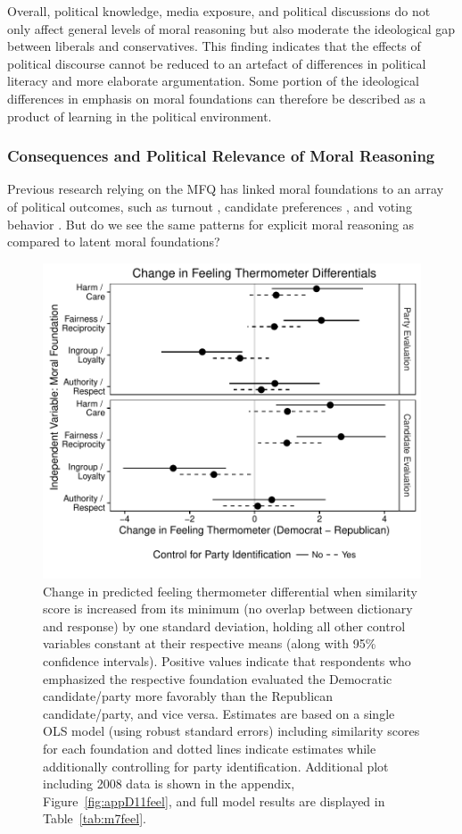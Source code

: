 \documentclass[12pt]{article}
\begin{document}
\clearpage
Overall, political knowledge, media exposure, and political discussions do not only affect general levels of moral reasoning but also moderate the ideological gap between liberals and conservatives. This finding indicates that the effects of political discourse cannot be reduced to an artefact of differences in political literacy and more elaborate argumentation. Some portion of the ideological differences in emphasis on moral foundations can therefore be described as a product of learning in the political environment.


\subsubsection{Consequences and Political Relevance of Moral Reasoning}

Previous research relying on the MFQ has linked moral foundations to an array of political outcomes, such as turnout \citep{johnson2014ideology}, candidate preferences \citep{iyer2010beyond}, and voting behavior \citep{franks2015using}. But do we see the same patterns for explicit moral reasoning as compared to latent moral foundations?

\begin{figure}[h]\centering
\includegraphics[scale=.9]{../calc/fig/fig7feel.pdf}
\caption{Change in predicted feeling thermometer differential when similarity score is increased from its minimum (no overlap between dictionary and response) by one standard deviation, holding all other control variables constant at their respective means (along with 95\% confidence intervals). Positive values indicate that respondents who emphasized the respective foundation evaluated the Democratic candidate/party more favorably than the Republican candidate/party, and vice versa. Estimates are based on a single OLS model (using robust standard errors) including similarity scores for each foundation and dotted lines indicate estimates while additionally controlling for party identification. Additional plot including 2008 data is shown in the appendix, Figure~\ref{fig:appD11feel}, and full model results are displayed in Table~\ref{tab:m7feel}.}\label{fig:7feel}
\end{figure}
\end{document}
